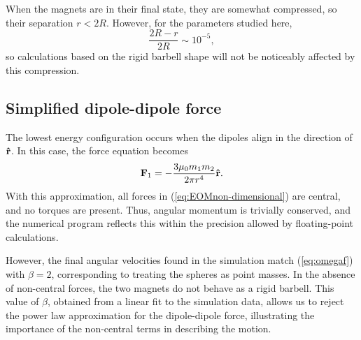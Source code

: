 \documentclass{article}
\begin{document}





When the magnets are in their final state, they are somewhat compressed, so their separation $r  < 2R$.
However, for the parameters studied here, 
\begin{equation}
    \frac{2R-r }{2R} \sim 10^{-5},
\end{equation}
so calculations based on the rigid barbell shape will not be noticeably affected by this compression.




\subsection{Simplified dipole-dipole force}\label{simple}
The lowest energy configuration occurs when the dipoles align in the direction of $\vu{r} $. In this case, the force equation becomes
\begin{equation}
\vb{F}_1=-\frac{3\mu_0m_1m_2}{2\pi r ^4}  \vu{r}  . \label{eq:simple}
\end{equation}
With this approximation, all forces in (\ref{eq:EOMnon-dimensional}) are central, and no torques are present. Thus, angular momentum is trivially conserved, and the numerical program reflects this within the precision allowed by floating-point calculations.

However, the final angular velocities found in the simulation  match (\ref{eq:omegaf}) with $\beta=2$, corresponding to treating the spheres as point masses. In the absence of non-central forces, the two magnets do not behave as a rigid barbell.
This value of $\beta$, obtained from a linear fit to the simulation data, allows us to reject the power law approximation for the dipole-dipole force,  illustrating the importance of the non-central terms in describing the motion.
\end{document}

